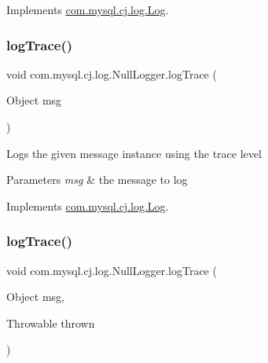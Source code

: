 Implements \mbox{\hyperlink{interfacecom_1_1mysql_1_1cj_1_1log_1_1_log_abad2a5a44ff04b24bf46a58997e4f7da}{com.\+mysql.\+cj.\+log.\+Log}}.

\mbox{\label{classcom_1_1mysql_1_1cj_1_1log_1_1_null_logger_a090baffde957c89a83f1941bcb7cd4d7}} 
\subsubsection{\texorpdfstring{log\+Trace()}{logTrace()}\hspace{0.1cm}{\footnotesize\ttfamily [1/2]}}
{\footnotesize\ttfamily void com.\+mysql.\+cj.\+log.\+Null\+Logger.\+log\+Trace (\begin{DoxyParamCaption}\item[{Object}]{msg }\end{DoxyParamCaption})}

Logs the given message instance using the \textquotesingle{}trace\textquotesingle{} level


\begin{DoxyParams}{Parameters}
{\em msg} & the message to log \\
\hline
\end{DoxyParams}


Implements \mbox{\hyperlink{interfacecom_1_1mysql_1_1cj_1_1log_1_1_log_a04f51d4b9464df28c94695ae8159440e}{com.\+mysql.\+cj.\+log.\+Log}}.

\mbox{\label{classcom_1_1mysql_1_1cj_1_1log_1_1_null_logger_a49552fc2c395b97c7916eb698ddd3315}} 
\subsubsection{\texorpdfstring{log\+Trace()}{logTrace()}\hspace{0.1cm}{\footnotesize\ttfamily [2/2]}}
{\footnotesize\ttfamily void com.\+mysql.\+cj.\+log.\+Null\+Logger.\+log\+Trace (\begin{DoxyParamCaption}\item[{Object}]{msg,  }\item[{Throwable}]{thrown }\end{DoxyParamCaption})}

